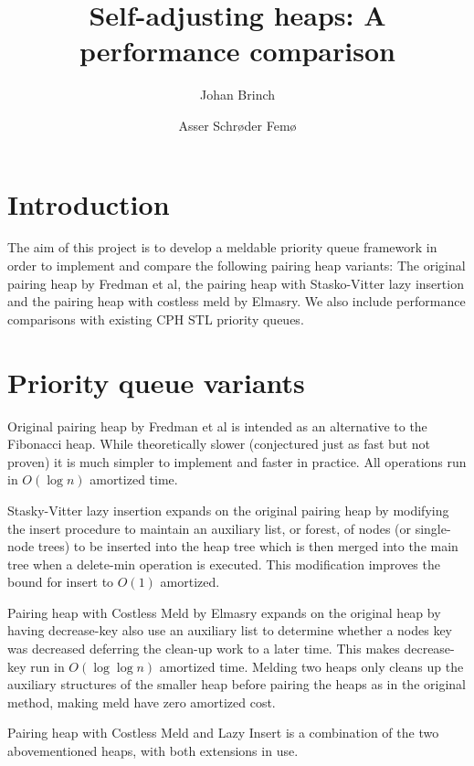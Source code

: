 \documentclass{DIKU-article}[2010/01/13]
\title{Self-adjusting heaps: A performance comparison}
\author{
Johan Brinch
\and
Asser Schrøder Femø
}
\institute{
Department of Computing, University of Copenhagen\\
Universitetsparken 1, DK-2100 Copenhagen East, Denmark\\
\email{...@diku.dk}
\and
\email{asser@diku.dk}
}
\begin{document}
\maketitle

\begin{abstract}
\end{abstract}

\begin{subject}
\end{subject}

\section{Introduction}

The aim of this project is to develop a meldable priority queue framework in
order to implement and compare the following pairing heap variants: The original
pairing heap by Fredman et al, the pairing heap with Stasko-Vitter lazy insertion and
the pairing heap with costless meld by Elmasry. We also include performance
comparisons with existing CPH STL priority queues.

\section{Priority queue variants}

\begin{description}
\item{Original pairing heap} by Fredman et al\cite{fredman} is intended as an
alternative to the Fibonacci heap. While theoretically slower (conjectured just
as fast but not proven) it is much simpler to implement and faster in practice.
All operations run in $O(\log n)$ amortized time.

\item{Stasky-Vitter lazy insertion} expands on the original pairing heap by
modifying the insert procedure to maintain an auxiliary list, or forest, of
nodes (or single-node trees) to be inserted into the heap tree which is then
merged into the main tree when a delete-min operation is executed. This
modification improves the bound for insert to $O(1)$ amortized.

\item{Pairing heap with Costless Meld} by Elmasry\cite{elmasry} expands on
the original heap by having decrease-key also use an auxiliary list to
determine whether a nodes key was decreased deferring the clean-up work to a
later time. This makes decrease-key run in $O(\log \log n)$ amortized time.
Melding two heaps only cleans up the auxiliary structures of the smaller heap
before pairing the heaps as in the original method, making meld have zero
amortized cost.

\item{Pairing heap with Costless Meld and Lazy Insert} is a combination of the
two abovementioned heaps, with both extensions in use.
\end{description}
\end{document}
